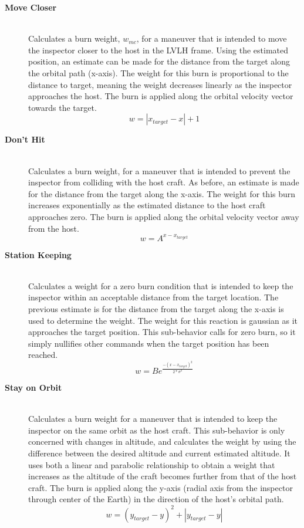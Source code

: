 \documentclass[journal, 10pt]{IEEEtran}
\begin{document}
\begin{description}
\item[\textbf{Move Closer}] \hfill \\
Calculates a burn weight, $w_{mc}$, for a maneuver that is intended to move the inspector closer to the host in the LVLH frame.  Using the estimated position, an estimate can be made for the distance from the target along the orbital path (x-axis).  The weight for this burn is proportional to the distance to target, meaning the weight decreases linearly as the inspector approaches the host.  The burn is applied along the orbital velocity vector towards the target.
\begin{equation}
w = |x_{target}-x|+1
\end{equation}

\item[\textbf{Don't Hit}] \hfill \\
Calculates a burn weight, for a maneuver that is intended to prevent the inspector from colliding with the host craft.  As before, an estimate is made for the distance from the target along the x-axis.  The weight for this burn increases exponentially as the estimated distance to the host craft approaches zero.  The burn is applied along the orbital velocity vector away from the host.
\begin{equation}
w = A^{x-x_{target}}
\end{equation}

\item[\textbf{Station Keeping}] \hfill \\
Calculates a weight for a zero burn condition that is intended to keep the inspector within an acceptable distance from the target location.  The previous estimate is for the distance from the target along the x-axis is used to determine the weight.  The weight for this reaction is gaussian as it approaches the target position.  This sub-behavior calls for zero burn, so it simply nullifies other commands when the target position has been reached.
\begin{equation}
w = Be^{\frac{-(x-x_{target})^2}{2*\sigma^2}}
\end{equation}

\item[\textbf{Stay on Orbit}] \hfill \\
Calculates a burn weight for a maneuver that is intended to keep the inspector on the same orbit as the host craft.  This sub-behavior is only concerned with changes in altitude, and calculates the weight by using the difference between the desired altitude and current estimated altitude.  It uses both a linear and parabolic relationship to obtain a weight that increases as the altitude of the craft becomes further from that of the host craft.  The burn is applied along the y-axis (radial axis from the inspector through center of the Earth) in the direction of the host's orbital path.
\begin{equation}
w = (y_{target}-y)^2+|y_{target}-y|
\end{equation}


\end{description}
\end{document}

